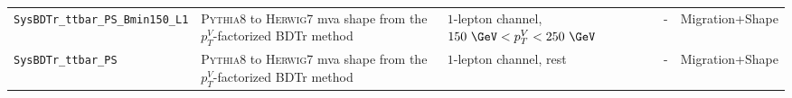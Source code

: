 \begin{table}
{\begin{tabular}{lllll}
      \texttt{SysBDTr\_ttbar\_PS\_Bmin150\_L1} & \textsc{Pythia8} to \textsc{Herwig7} mva shape from the $p_T^V$-factorized BDTr method  & $1$-lepton channel, $150~\GeV< p_T^V <250~\GeV$ & - & Migration+Shape \\
      \texttt{SysBDTr\_ttbar\_PS} & \textsc{Pythia8} to \textsc{Herwig7} mva shape from the $p_T^V$-factorized BDTr method  & $1$-lepton channel, rest & - & Migration+Shape \\
\bottomrule
\end{tabular}
}
\end{table}
